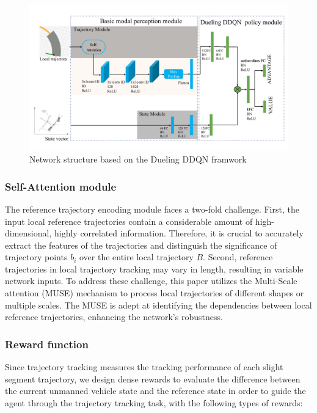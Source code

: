 \documentclass[sn-mathphys]{sn-jnl}%
\theoremstyle{thmstyleone}%
\theoremstyle{thmstyletwo}%
\theoremstyle{thmstylethree}%
\begin{document}
\begin{figure}
	\centering
	\includegraphics[width=0.9\linewidth]{Net_structure}
	\caption{Network structure based on the Dueling DDQN framwork}
	\label{fig:Network Structure}
\end{figure}


\subsubsection{Self-Attention module}
The reference trajectory encoding module faces a two-fold challenge. First, the input local reference trajectories contain a considerable amount of high-dimensional, highly correlated information. Therefore, it is crucial to accurately extract the features of the trajectories and distinguish the significance of trajectory points $b_i$ over the entire local trajectory $B$. Second, reference trajectories in local trajectory tracking may vary in length, resulting in variable network inputs. To address these challenge, this paper utilizes the Multi-Scale attention (MUSE) mechanism  to process local trajectories of different shapes or multiple scales\cite{zhaoMUSEParallelMultiScale2019}. The MUSE is adept at identifying the dependencies between local reference trajectories, enhancing the network's robustness.


\subsubsection{Reward function}
Since trajectory tracking measures the tracking performance of each slight segment trajectory, we design dense rewards to evaluate the difference between the current unmanned vehicle state and the reference state in order to guide the agent through the trajectory tracking task, with the following types of rewards:
\end{document}
